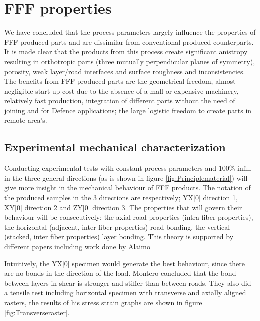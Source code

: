 
\section{FFF properties}
    \label{chp:FFF properties}
We have concluded that the process parameters largely influence the properties of FFF produced parts and are dissimilar from conventional produced counterparts. It is made clear that the products from this process create significant anistropy resulting in orthotropic parts (three mutually perpendicular planes of symmetry), porosity, weak layer/road interfaces and surface roughness and inconsistencies. The benefits from FFF produced parts are the geometrical freedom, almost negligible start-up cost due to the absence of a mall or expensive machinery, relatively fast production, integration of different parts without the need of joining and for Defence applications; the large logistic freedom to create parts in remote area's.

\subsection{Experimental mechanical characterization}
Conducting experimental tests with constant process parameters and 100\% infill in the three general directions (as is shown in figure \ref{fig:Principlematerial}) will give more insight in the mechanical behaviour of FFF products. The notation of the produced samples in the 3 directions are respectively; YX[0] direction 1, XY[0] direction 2 and ZY[0] direction 3. The properties that will govern their behaviour will be consecutively; the axial road properties (intra fiber properties), the horizontal (adjacent, inter fiber properties) road bonding, the vertical (stacked, inter fiber properties) layer bonding. This theory is supported by different papers including work done by Alaimo \cite{Alaimo2017InfluenceParts}

Intuitively, the YX[0] specimen would generate the best behaviour, since there are no bonds in the direction of the load. Montero \cite{Montero2001MaterialExperiments} concluded that the bond between layers in shear is stronger and stiffer  than between roads. They also did a tensile test including horizontal specimen with transverse and axially aligned rasters, the results of his stress strain graphs are shown in figure \ref{fig:Transverseraster}. 

